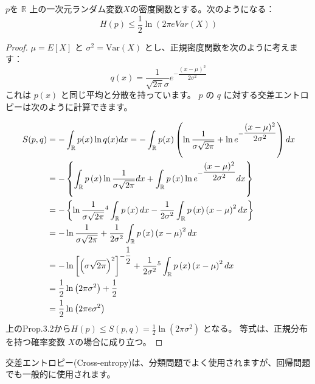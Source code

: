 \documentclass[a4paper]{jsarticle}%
\begin{document}
\begin{cor}
  $p$を $\mathbb{R}$ 上の一次元ランダム変数$X$の密度関数とする。次のようになる：
\[ 
H(p) \leq \frac{1}{2} \ln(2\pi e Var(X))
\]

\begin{proof}
  $\mu = E[X]$ と $\sigma^2 = \text{Var}(X) $ とし、正規密度関数を次のように考えます：
\[ q(x) = \frac{1}{\sqrt{2\pi}\sigma} e^{-\dfrac{(x - \mu)^2}{2\sigma^2}} \]
これは $p(x)$  と同じ平均と分散を持っています。 $p$  の $q$ に対する交差エントロピーは次のように計算できます。

\begin{align*}
  S(p, q) &= -\int_{\mathbb{R}} p(x) \ln q(x) dx = -\int_{\mathbb{R}}p(x)\left(\ln\dfrac{1}{\sigma \sqrt{2\pi}} + \ln e^{-\dfrac{(x - \mu)^2}{2\sigma^2}}\right)dx\\
  &= -\left\{\int_{\mathbb{R}}p\left(x\right)\ln \dfrac{1}{\sigma \sqrt{2\pi}} dx + \int_{\mathbb{R}}p \left(x\right)\ln e^{-\dfrac{(x - \mu)^2}{2\sigma^2}} dx\right\}\\
  &= -\left\{\ln \dfrac{1}{\sigma \sqrt{2\pi}}\footnotemark[4]\int_{\mathbb{R}}p \left(x\right)dx -\dfrac{1}{2\sigma^2}\int_{\mathbb{R}}p \left(x\right) \left(x-\mu\right)^2 dx\right\}\\
  &= -\ln \dfrac{1}{\sigma \sqrt{2\pi}} + \dfrac{1}{2\sigma^2}\int_{\mathbb{R}}p \left(x\right) \left(x-\mu\right)^2 dx\\
  &= -\ln \left[\left(\sigma \sqrt{2\pi}\right)^2\right]^{-\dfrac{1}{2}} + \dfrac{1}{2\sigma^2}\footnotemark[5]\int_{\mathbb{R}}p \left(x\right) \left(x-\mu\right)^2 dx\\
  &= \dfrac{1}{2}\ln \left(2\pi\sigma^2\right)+ \dfrac{1}{2}\\
  &= \dfrac{1}{2}\ln \left(2\pi e\sigma^2\right)
\end{align*}
上のProp.3.2から$H(p) \leq S(p, q) = \frac{1}{2} \ln(2\pi\sigma^2)$ となる。
等式は、正規分布を持つ確率変数 $ X $の場合に成り立つ。
\end{proof}
\end{cor}

\begin{rem}
  交差エントロピー(Cross-entropy)は、分類問題でよく使用されますが、回帰問題でも一般的に使用されます。
\end{rem}
\end{document}

